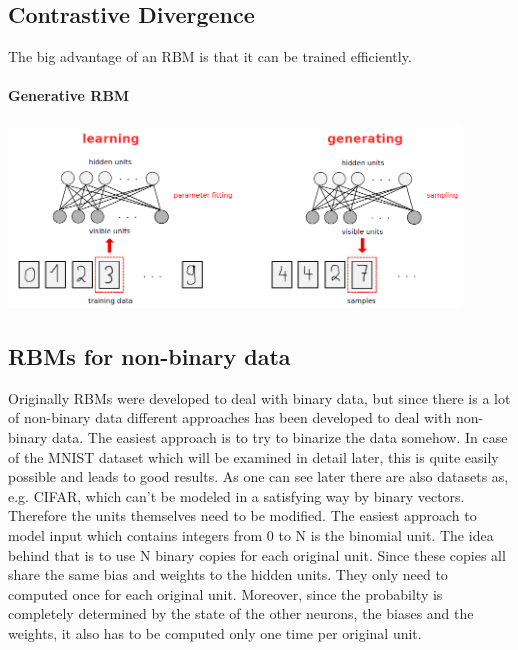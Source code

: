 \documentclass[a4paper]{scrartcl}
\begin{document}
\subsection{Contrastive Divergence}
The big advantage of an RBM is that it can be trained efficiently. 
\paragraph{Generative RBM}
\begin{center}
\includegraphics[width=12cm]{images/generativeRBM.png}
\end{center}

\subsection{RBMs for non-binary data}
Originally RBMs were developed to deal with binary data, but since there is a lot of non-binary data different approaches has been developed to deal with non-binary data. The easiest approach is to try to binarize the data somehow. In case of the MNIST dataset which will be examined in detail later, this is quite easily possible and leads to good results. As one can see later there are also datasets as, e.g. CIFAR, which can't be modeled in a satisfying way by binary vectors. Therefore the units themselves need to be modified. The easiest approach to model input which contains integers from 0 to N is the binomial unit. The idea behind that is to use N binary copies for each original unit. Since these copies all share the same bias and weights to the hidden units. They only need to computed once for each original unit. Moreover, since the probabilty is completely determined by the state of the other neurons, the biases and the weights, it also has to be computed only one time per original unit.
\end{document}
